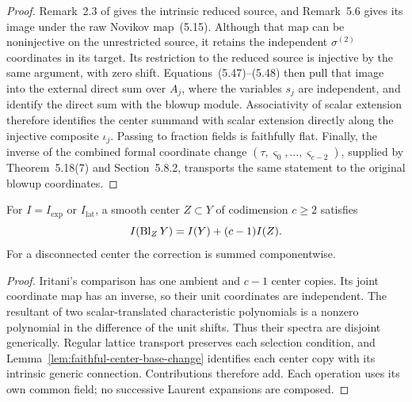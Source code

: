 \begin{proof}
Remark~2.3 of \cite{IritaniBlowup} gives the intrinsic reduced source, and
Remark~5.6 gives its image under the raw Novikov map~(5.15).
Although that map can be noninjective on the unrestricted source, it retains
the independent \(\sigma^{(2)}\) coordinates in its target.  Its restriction
to the reduced source is injective by the same argument, with zero shift.
Equations~(5.47)--(5.48) then pull that image into the external direct sum over
\(A_j\), where the variables \(s_j\) are independent, and identify the direct
sum with the blowup module.  Associativity of scalar extension therefore
identifies the center summand with scalar extension directly along the
injective composite \(\iota_j\).  Passing to fraction fields is faithfully
flat.  Finally, the inverse of the combined formal coordinate change
\((\tau,\varsigma_0,\ldots,\varsigma_{c-2})\), supplied by
Theorem~5.18(7) and Section~5.8.2, transports the same statement to the
original blowup coordinates.
\end{proof}

\begin{proposition}
\label{prop:numerical-blowup}%
For $I=I_{\mathrm{exp}}$ or $I_{\mathrm{lat}}$, a smooth center
$Z\subset Y$ of codimension $c\ge2$ satisfies
\begin{equation}
 I(\operatorname{Bl}_ZY)=I(Y)+(c-1)I(Z).
 \label{eq:numerical-blowup}
\end{equation}
For a disconnected center the correction is summed componentwise.
\end{proposition}
\begin{proof}
Iritani's comparison has one ambient and $c-1$ center copies.
Its joint coordinate map has an inverse, so their unit coordinates are
independent. The resultant of two scalar-translated characteristic
polynomials is a nonzero polynomial in the difference of the unit shifts.
Thus their spectra are disjoint generically. Regular lattice transport
preserves each selection condition, and
Lemma~\ref{lem:faithful-center-base-change} identifies each center copy with
its intrinsic generic connection. Contributions therefore add.
Each operation uses its own common field; no successive Laurent expansions
are composed.
%
%
\end{proof}

